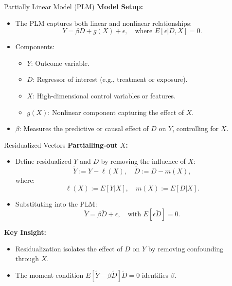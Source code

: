 \documentclass[xcolor=svgnames,t]{beamer}
\begin{document}
   \begin{frame}{Partially Linear Model (PLM)}
    \textbf{Model Setup:}
    \begin{itemize}
        \item The PLM captures both linear and nonlinear relationships:
        \[
        Y = \beta D + g(X) + \epsilon, \quad \text{where } E[\epsilon | D, X] = 0.
        \]
        \pause
        \item Components:
        \begin{itemize}
            \item \(Y\): Outcome variable.
            \item \(D\): Regressor of interest (e.g., treatment or exposure).
            \item \(X\): High-dimensional control variables or features.
            \item \(g(X)\): Nonlinear component capturing the effect of \(X\).
        \end{itemize}
        \pause
        \item \(\beta\): Measures the predictive or causal effect of \(D\) on \(Y\), controlling for \(X\).
    \end{itemize}
    
    
    \end{frame}
    
    \begin{frame}{Residualized Vectors}
        \textbf{Partialling-out \(X\):}
        \begin{itemize}
            \item Define residualized \(Y\) and \(D\) by removing the influence of \(X\):
            \[
            \tilde{Y} := Y - \ell(X), \quad \tilde{D} := D - m(X),
            \]
            where:
            \[
            \ell(X) := E[Y | X], \quad m(X) := E[D | X].
            \]
            \pause
            \item Substituting into the PLM:
            \[
            \tilde{Y} = \beta \tilde{D} + \epsilon, \quad \text{with } E[\epsilon \tilde{D}] = 0.
            \]
        \end{itemize}
        
        \pause
        
        \textbf{Key Insight:}
        \begin{itemize}
            \item Residualization isolates the effect of \(D\) on \(Y\) by removing confounding through \(X\).
            \item The moment condition \(E[\tilde{Y} - \beta \tilde{D}]\tilde{D} = 0\) identifies \(\beta\).
        \end{itemize}
        \end{frame}
           
\end{document}
